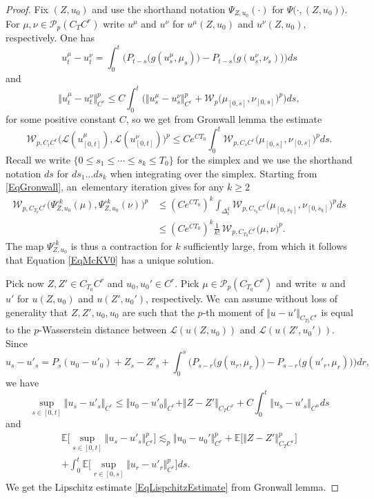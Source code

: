\documentclass[JEP,XML,SOM,Unicode,published]{cedram}
\theoremstyle{definition}
\newcommand\bbE{\mathbb{E}}
\newcommand{\mcL}{\mathcal{L}}
\newcommand{\norme}[1]{\Vert #1 \Vert}
\begin{document}
\begin{proof}
Fix $(Z,u_0)$ and use the shorthand notation $\Psi_{Z,u_0}(\cdot)$ for $\Psi\bigl(\cdot,(Z,u_0)\bigr)$. For $\mu,\nu\in \mathcal{P}_p(C_TC^r)$ write $u^\mu$ and $u^{\nu}$ for $u^\mu(Z, u_0)$ and $u^{\nu}(Z, u_0)$, respectively. One has
\[
u^\mu_t - u_t^{\nu} = \int_0^t \bigl(P_{t-s}\bigl(g(u^\mu_s,\mu_s)\bigr) - P_{t-s}\bigl(g(u^{\nu}_s,\nu_s)\bigr)\bigr)ds
\]
and
\[
\big\Vert u^\mu_t-u^{\nu}_t \big\Vert_{C^r}^p \leq C\int_0^t \bigl(\big\Vert u^\mu_s - u^{\nu}_s\big\Vert_{C^r}^p + \mathcal{W}_p\bigl(\mu_{[0,s]},\nu_{[0,s]}\bigr)^p\bigr) ds,
\]
for some positive constant $C$, so we get from Gronwall lemma the estimate
\begin{equation} \label{EqGronwall}
\mathcal{W}_{p,C_tC^r}\bigl(\mcL(u^\mu_{[0,t]}),\mcL(u^{\nu}_{[0,t]})\bigr)^p \leq Ce^{CT_0}\int_0^t \mathcal{W}_{p,C_sC^r}\bigl(\mu_{[0,s]},\nu_{[0,s]}\bigr)^pds.
\end{equation}
Recall we write $\{0\leq s_1\leq \cdots\leq s_k\leq T_0\}$ for the simplex and we use the shorthand notation $ds$ for $ds_1\dots ds_k$ when integrating over the simplex. Starting from \eqref{EqGronwall}, an~elementary iteration gives for any $k\geq 2$
\begin{align*}
\mathcal{W}_{p,C_{T_0}C^r}\bigl(\Psi_{Z,u_0}^{\circ k}(\mu), \Psi_{Z,u_0}^{\circ k}(\nu)\bigr)^p &\leq (Ce^{CT_0})^k\int_{\Delta^k_t}
\mathcal{W}_{p,C_{s_k}C^r}\bigl(\mu_{[0,s_k]}, \nu_{[0,s_k]}\bigr)^pds \\
&\leq (Ce^{CT_0})^k \frac{1}{k!} \, \mathcal{W}_{p,C_{T_0}C^r}\bigl(\mu, \nu\bigr)^p.
\end{align*}
The map $\Psi_{Z,u_0}^{\circ k}$ is thus a contraction for $k$ sufficiently large, from which it follows that Equation \eqref{EqMcKV0} has a unique solution.

Pick now $Z, Z' \in C_{T_0}C^r$ and $u_0, u_0' \in C^r$. Pick $\mu\in \mathcal{P}_p(C_{T_0}C^r)$ and write~$u$ and~$u'$ for $u(Z, u_0)$ and $u(Z', u_0')$, respectively. We~can assume without loss of generality that $Z, Z', u_0, u_0 $ are such that the $p$-th moment of $\norme{u - u'}_{C_{T_0}C^r}$ is equal to the $p$-Wasserstein distance between $\mcL(u(Z,u_0))$ and $\mcL(u(Z', u_0' ))$. Since
\[
u_s - u'_s = P_s(u_0 - u'_0 ) + Z_s - Z' _s + \int_0^s \bigl( P_{s-r}\bigl(g(u_r,\mu_r)\bigr) - P_{s-r}\bigl(g(u'_r,\mu_r)\bigr)\bigr) dr,
\]
we have
\begin{equation*}
\sup_{s\in[0,t]} \norme{u_s - u'_s}_{C^r} \leq \norme{u_0 - u'_0 }_{C^r} + \norme{Z - Z' }_{C_T C^r} + C \int_0^t \norme{u_s - u'_s}_{C^\alpha} ds
\end{equation*}
and
\begin{multline*}
\bbE\bigl[\sup_{s\in[0,t]} \norme{u_s - u'_s}_{C^r}^p\bigr] \lesssim_p \norme{u_0 - u_0' }_{C^r}^p + \bbE\bigl[\norme{Z - Z' }_{C_T C^r}^p\bigr] \\[-5pt]
+ \int_0^t \bbE\bigl[\sup_{r\in[0,s]}\norme{u_r - u'_r}_{C^r}^p\bigr]ds.
\end{multline*}
We get the Lipschitz estimate \eqref{EqLispchitzEstimate} from Gronwall lemma.
\end{proof}
\end{document}
